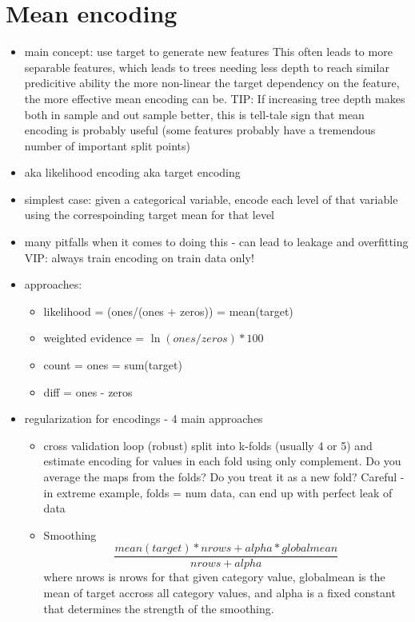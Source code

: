 \documentclass[a4paper]{report}
\begin{document}
\section{Mean encoding}
\begin{itemize}
  \item main concept: use target to generate new features
    \subitem This often leads to more separable features, which leads to trees needing less depth to reach similar predicitive ability
    \subitem the more non-linear the target dependency on the feature, the more effective mean encoding can be.
    \subitem TIP: If increasing tree depth makes both in sample and out sample better, this is tell-tale sign that mean encoding is probably useful (some features probably have a tremendous number of important split points)
  \item aka likelihood encoding aka target encoding
  \item simplest case: given a categorical variable, encode each level of that variable using the correspoinding target mean for that level
  \item many pitfalls when it comes to doing this - can lead to leakage and overfitting
    \subitem VIP: always train encoding on train data only!
  \item approaches:
    \begin{itemize}
      \item likelihood = (ones/(ones + zeros)) = mean(target)
      \item weighted evidence = $ \ln(ones/zeros) * 100$
      \item count = ones = sum(target)
      \item diff = ones - zeros
    \end{itemize}
  \item regularization for encodings - 4 main approaches
    \begin{itemize}
      \item cross validation loop (robust)
	\subitem split into k-folds (usually 4 or 5) and estimate encoding for values in each fold using only complement.
	 Do you average the maps from the folds? Do you treat it as a new fold?
	\subitem Careful - in extreme example, folds = num data, can end up with perfect leak of data
      \item Smoothing
      $$ \frac{mean(target)*nrows + alpha*globalmean}{nrows + alpha} $$
      where nrows is nrows for that given category value, globalmean is the mean of target accross all category values, and alpha is a fixed constant that determines the strength of the smoothing.

\end{itemize}
\end{itemize}
\end{document}
